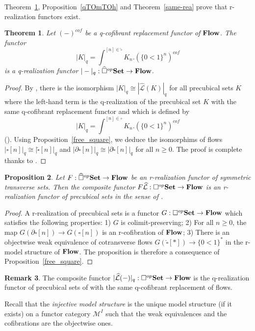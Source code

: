 \documentclass[a4paper,12pt]{amsart}
\newcommand{\de}{\partial}
\newtheorem{thm}{Theorem}[section]
\newtheorem{prop}[thm]{Proposition}
\newcommand{\bp}{\begin{prop}}
\newcommand{\ep}{\end{prop}}
\newcommand{\bth}{\begin{thm}}
\renewcommand{\eth}{\end{thm}}
\newcommand{\bpf}{\begin{proof}}
\newcommand{\epf}{\end{proof}}
\theoremstyle{definition}
\newtheorem{rem}[thm]{Remark}
\newcommand{\iso}{\cong}
\renewcommand{\geq}{\geqslant}
\newcommand{\brm}[1]{{\rm{\mathbf{#1}}}}
\newcommand{\dtop}{{\brm{Flow}}}
\newcommand{\set}{{\brm{Set}}}
\begin{document}
Theorem~\ref{exists}, Proposition~\ref{qTOmTOh} and Theorem~\ref{same-rea} prove that r-realization functors exist.


\bth \label{exists}
Let $(-)^{cof}$ be a q-cofibrant replacement functor of $\dtop$. The functor 
\[{|K|_q = \int^{[n]\in \widehat{\square}} K_n.(\{0<1\}^n)^{cof}}
\]
is a q-realization functor $|-|_q:\widehat{\square}^{op}\set \to \dtop$. 
\eth

\bpf
By \cite[Proposition~2.2.10]{symcub}, there is the isomorphism $|K|_q \iso |\widehat{\mathcal{L}}(K)|_q$ for all precubical sets $K$ where the left-hand term is the q-realization of the precubical set $K$ with the same q-cofibrant replacement functor and which is defined by 
\[{|K|_q = \int^{[n]\in {\square}} K_n.(\{0<1\}^n)^{cof}}
\]
(\cite[Theorem~3.9]{NaturalRealization}). Using Proposition~\ref{free_square}, we deduce the isomorphims of flows $|\square[n]|_q \iso |\widehat{\square}[n]|_q$ and $|\de\square[n]|_q \iso |\de\widehat{\square}[n]|_q$ for all $n\geq 0$. The proof is complete thanks to \cite[Proposition~7.4]{ccsprecub}.
\epf


\bp \label{restriction_precubical}
Let $F:\widehat{\square}^{op}\set \to \dtop$ be an r-realization functor of symmetric transverse sets. Then the composite functor $F\widehat{\mathcal{L}}:\square^{op}\set\to \dtop$ is an r-realization functor of precubical sets in the sense of \cite[Definition~3.6]{NaturalRealization}.
\ep

\bpf
A r-realization of precubical sets is a functor $G:{\square}^{op}\set \to \dtop$ which satisfies the following properties: 1) $G$ is colimit-preserving; 2) For all $n\geq 0$, the map $G(\de{\square}[n])\to G({\square}[n])$ is an r-cofibration of $\dtop$; 3) There is an objectwise weak equivalence of cotransverse flows $G(\widehat{\square}[*])\to \{0<1\}^*$ in the r-model structure of $\dtop$. The proposition is therefore a consequence of Proposition~\ref{free_square}.
\epf


\begin{rem}
	The composite functor $|\widehat{\mathcal{L}}(-)|_q:{\square}^{op}\set \to \dtop$ is the q-realization functor of precubical sets of \cite[Theorem~3.9]{NaturalRealization} with the same q-cofibrant replacement of flows.
\end{rem}

Recall that the \textit{injective model structure} is the unique model structure (if it exists) on a functor category $\mathcal{M}^I$ such that the weak equivalences and the cofibrations are the objectwise ones.
\end{document}
